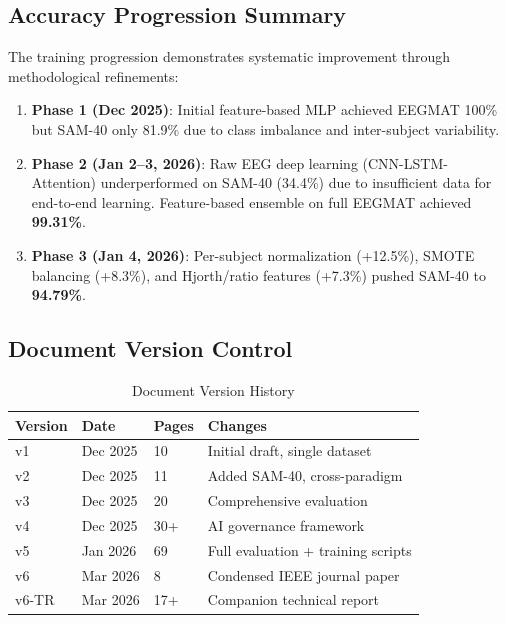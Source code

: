 \documentclass[11pt,a4paper]{article}
\begin{document}
\subsection{Accuracy Progression Summary}

The training progression demonstrates systematic improvement through methodological refinements:

\begin{enumerate}[leftmargin=*]
\item \textbf{Phase 1 (Dec 2025)}: Initial feature-based MLP achieved EEGMAT 100\% but SAM-40 only 81.9\% due to class imbalance and inter-subject variability.
\item \textbf{Phase 2 (Jan 2--3, 2026)}: Raw EEG deep learning (CNN-LSTM-Attention) underperformed on SAM-40 (34.4\%) due to insufficient data for end-to-end learning. Feature-based ensemble on full EEGMAT achieved \textbf{99.31\%}.
\item \textbf{Phase 3 (Jan 4, 2026)}: Per-subject normalization (+12.5\%), SMOTE balancing (+8.3\%), and Hjorth/ratio features (+7.3\%) pushed SAM-40 to \textbf{94.79\%}.
\end{enumerate}

\subsection{Document Version Control}

\begin{table}[H]
\centering
\caption{Document Version History}
\small
\begin{tabular}{llll}
\toprule
\textbf{Version} & \textbf{Date} & \textbf{Pages} & \textbf{Changes} \\
\midrule
v1 & Dec 2025 & 10 & Initial draft, single dataset \\
v2 & Dec 2025 & 11 & Added SAM-40, cross-paradigm \\
v3 & Dec 2025 & 20 & Comprehensive evaluation \\
v4 & Dec 2025 & 30+ & AI governance framework \\
v5 & Jan 2026 & 69 & Full evaluation + training scripts \\
v6 & Mar 2026 & 8 & Condensed IEEE journal paper \\
v6-TR & Mar 2026 & 17+ & Companion technical report \\
\bottomrule
\end{tabular}
\end{table}

\end{document}
